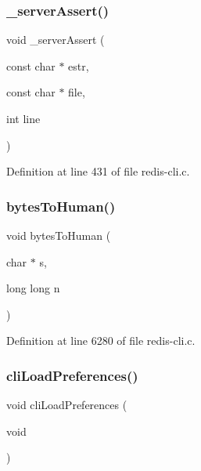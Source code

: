 \subsubsection{\texorpdfstring{\+\_\+server\+Assert()}{\_serverAssert()}}
{\footnotesize\ttfamily void \+\_\+server\+Assert (\begin{DoxyParamCaption}\item[{const char $\ast$}]{estr,  }\item[{const char $\ast$}]{file,  }\item[{int}]{line }\end{DoxyParamCaption})}



Definition at line 431 of file redis-\/cli.\+c.

\mbox{\label{redis-cli_8c_a36fd850a51dbdede80f4f09a6b597c76}} 
\subsubsection{\texorpdfstring{bytes\+To\+Human()}{bytesToHuman()}}
{\footnotesize\ttfamily void bytes\+To\+Human (\begin{DoxyParamCaption}\item[{char $\ast$}]{s,  }\item[{long long}]{n }\end{DoxyParamCaption})}



Definition at line 6280 of file redis-\/cli.\+c.

\mbox{\label{redis-cli_8c_ae90b8c7a065096325ddb291a04ac6cef}} 
\subsubsection{\texorpdfstring{cli\+Load\+Preferences()}{cliLoadPreferences()}}
{\footnotesize\ttfamily void cli\+Load\+Preferences (\begin{DoxyParamCaption}\item[{void}]{ }\end{DoxyParamCaption})}



